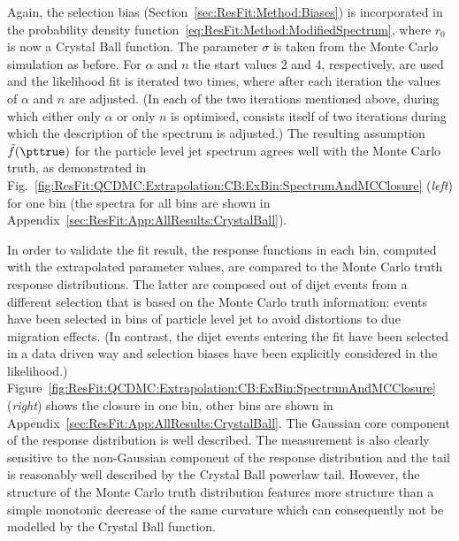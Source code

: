 Again, the selection bias (Section~\ref{sec:ResFit:Method:Biases}) is incorporated in the probability density function~\eqref{eq:ResFit:Method:ModifiedSpectrum}, where $r_{0}$ is now a Crystal Ball function.
The parameter $\sigma$ is taken from the Monte Carlo simulation as before.
For $\alpha$ and $n$ the start values 2 and 4, respectively, are used and the likelihood fit is iterated two times, where after each iteration the values of $\alpha$ and $n$ are adjusted.
(In each of the two iterations mentioned above, during which either only $\alpha$ or only $n$ is optimised, consists itself of two iterations during which the description of the spectrum is adjusted.)
The resulting assumption~$\tilde{f}(\pttrue)$ for the particle level jet \pt spectrum agrees well with the Monte Carlo truth, as demonstrated in Fig.~\ref{fig:ResFit:QCDMC:Extrapolation:CB:ExBin:SpectrumAndMCClosure} (\textit{left}) for one \pt bin (the spectra for all \pt bins are shown in Appendix~\ref{sec:ResFit:App:AllResults:CrystalBall}).

In order to validate the fit result, the response functions in each \pt bin, computed with the extrapolated parameter values, are compared to the Monte Carlo truth response distributions.
The latter are composed out of dijet events from a different selection that is based on the Monte Carlo truth information: events have been selected in bins of particle level jet \pt to avoid distortions to due migration effects.
(In contrast, the dijet events entering the fit have been selected in a data driven way and selection biases have been explicitly considered in the likelihood.)
Figure~\ref{fig:ResFit:QCDMC:Extrapolation:CB:ExBin:SpectrumAndMCClosure} (\textit{right}) shows the closure in one \pt bin, other \pt bins are shown in Appendix~\ref{sec:ResFit:App:AllResults:CrystalBall}.
The Gaussian core component of the response distribution is well described.
The measurement is also clearly sensitive to the non-Gaussian component of the response distribution and the tail is reasonably well described by the Crystal Ball powerlaw tail.
However, the structure of the Monte Carlo truth distribution features more structure than a simple monotonic decrease of the same curvature which can consequently not be modelled by the Crystal Ball function.
